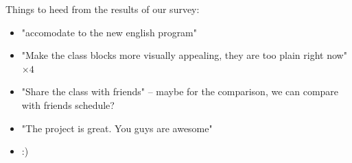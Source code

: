 \documentclass[letterpaper,12pt]{article}
\begin{document}
Things to heed from the results of our survey:
\begin{itemize}
    \item "accomodate to the new english program"
    \item "Make the class blocks more visually appealing, they are too plain right now" \(\times4\)
    \item "Share the class with friends" -- maybe for the comparison, we can compare with friends schedule?
    \item "The project is great. You guys are awesome"
    \item :)
\end{itemize}
\end{document}
